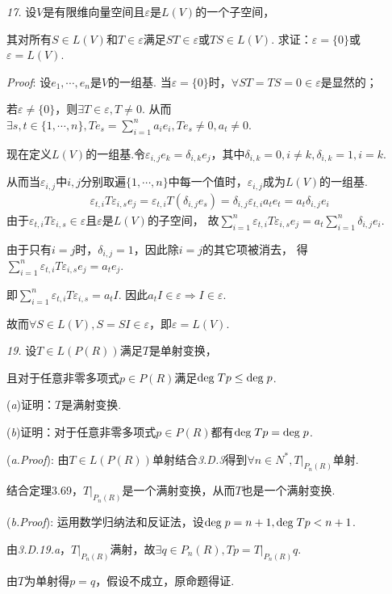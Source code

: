 \newpage

\textit{17.}
设\(V\)是有限维向量空间且\(\varepsilon\)是\(L(V)\)的一个子空间，

其对所有\(S \in L(V)\)和\(T \in \varepsilon\)满足\(ST \in \varepsilon\)或\(TS \in L(V)\).
求证：\(\varepsilon=\{0\}\)或\(\varepsilon=L(V)\).

\textit{Proof}:
设\(e_1,\cdots,e_n\)是\(V\)的一组基.
当\(\varepsilon =\{0\}\)时，\(\forall ST=TS=0 \in \varepsilon\)是显然的；

若\(\varepsilon \ne \{0\}\)，则\(\exists T \in \varepsilon, T \ne 0\).
从而\(\exists s,t \in \{1,\cdots,n\},Te_s=\sum_{i=1}^n a_ie_i ,Te_s \ne 0, a_t \ne 0\).

现在定义\(L(V)\)的一组基.令\(\varepsilon_{i,j}e_k=\delta_{i,k}e_j\)，其中\(\delta_{i,k}=0,i \ne k,\delta_{i,k}=1,i=k\).

从而当\(\varepsilon_{i,j}\)中\(i,j\)分别取遍\(\{1,\cdots,n\}\)中每一个值时，\(\varepsilon_{i,j}\)成为\(L(V)\)的一组基.
    \begin{align*}
        \varepsilon_{t,i}T\varepsilon_{i,s}e_j=\varepsilon_{t,i}T(\delta_{i,j} e_s) 
        =\delta_{i,j}\varepsilon_{t,i}a_te_t=a_t\delta_{i,j}e_i
    \end{align*}
由于\(\varepsilon_{t,i}T\varepsilon_{i,s} \in \varepsilon\)且\(\varepsilon\)是\(L(V)\)的子空间，
故\(\sum_{i=1}^n \varepsilon_{t,i}T\varepsilon_{i,s}e_j=a_t \sum_{i=1}^n \delta_{i,j}e_i\).

由于只有\(i=j\)时，\(\delta_{i,j}=1\)，因此除\(i=j\)的其它项被消去，
得\(\sum_{i=1}^n \varepsilon_{t,i} T \varepsilon_{i,s} e_j=a_te_j\).

即\(\sum_{i=1}^n \varepsilon_{t,i} T \varepsilon_{i,s} =a_t I\).
因此\(a_t I \in \varepsilon \Rightarrow I \in \varepsilon\).

故而\(\forall S \in L(V),S=SI \in \varepsilon\)，即\(\varepsilon=L(V)\).

\hspace*{\fill}

\textit{19.}
设\(T \in L(P(R))\)满足\(T\)是单射变换，

且对于任意非零多项式\(p \in P(R)\)满足\(\mathrm{deg \;} Tp \leq \mathrm{deg \;} p\).

(\textit{a})证明：\(T\)是满射变换.

(\textit{b})证明：对于任意非零多项式\(p \in P(R)\)都有\(\mathrm{deg \;} Tp=\mathrm{deg \;} p\).

(\textit{a.Proof}):
由\(T \in L(P(R))\)单射结合\textit{3.D.3}得到\(\forall n \in N^*,T|_{P_n(R)}\)单射.

结合定理3.69，\(T|_{P_n(R)}\)是一个满射变换，从而\(T\)也是一个满射变换.

(\textit{b.Proof}):
运用数学归纳法和反证法，设\(\mathrm{deg \;} p=n+1,\mathrm{deg \;} Tp<n+1\).

由\textit{3.D.19.a}，\(T|_{P_n(R)}\)满射，故\(\exists q \in P_n(R),Tp=T|_{P_n(R)}q\).

由\(T\)为单射得\(p=q\)，假设不成立，原命题得证.

